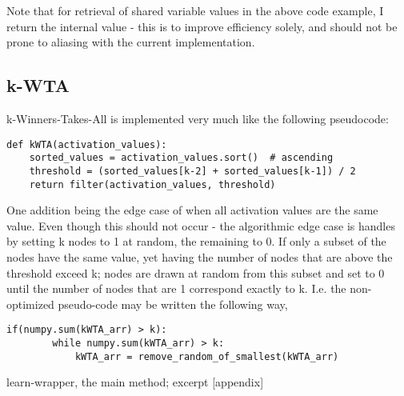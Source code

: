 Note that for retrieval of shared variable values in the above code example, I return the internal value - this is to improve efficiency solely, and should not be prone to aliasing with the current implementation.

\subsection*{k-WTA}

k-Winners-Takes-All is implemented very much like the following pseudocode:

\begin{Verbatim}[fontsize=\small]
def kWTA(activation_values):
    sorted_values = activation_values.sort()  # ascending
    threshold = (sorted_values[k-2] + sorted_values[k-1]) / 2
    return filter(activation_values, threshold)

\end{Verbatim}

One addition being the edge case of when all activation values are the same value. Even though this should not occur - the algorithmic edge case is handles by setting k nodes to 1 at random, the remaining to 0. If only a subset of the nodes have the same value, yet having the number of nodes that are above the threshold exceed k; nodes are drawn at random from this subset and set to 0 until the number of nodes that are 1 correspond exactly to k. I.e. the non-optimized pseudo-code may be written the following way,

\begin{Verbatim}[fontsize=\small]
    if(numpy.sum(kWTA_arr) > k):
        while numpy.sum(kWTA_arr) > k:
            kWTA_arr = remove_random_of_smallest(kWTA_arr)

\end{Verbatim}

learn-wrapper, the main method; excerpt [appendix]

\clearpage